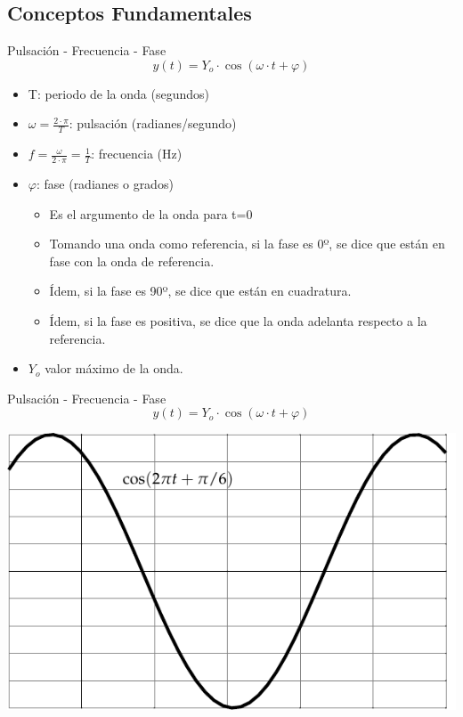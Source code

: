 \documentclass[xcolor={usenames,svgnames,dvipsnames}]{beamer}
\begin{document}
\subsection{Conceptos Fundamentales}
\label{sec:orgd3ab48b}
\begin{frame}[label={sec:org1051934}]{Pulsación - Frecuencia - Fase}
$$y(t)=Y_{o}\cdot\cos(\omega\cdot t+\varphi)$$

\begin{itemize}
\item T: periodo de la onda (segundos)

\item \(\omega=\frac{2\cdot\pi}{T}\): pulsación (radianes/segundo)

\item \(f=\frac{\omega}{2\cdot\pi}=\frac{1}{T}\): frecuencia (Hz)

\item \(\varphi\): fase (radianes o grados)

\begin{itemize}
\item Es el argumento de la onda para t=0

\item Tomando una onda como referencia, si la fase es 0º, se dice que
están en fase con la onda de referencia.

\item Ídem, si la fase es 90º, se dice que están en cuadratura.

\item Ídem, si la fase es positiva, se dice que la onda adelanta
respecto a la referencia.
\end{itemize}

\item \(Y_{o}\) valor máximo de la onda.
\end{itemize}
\end{frame}

\begin{frame}[label={sec:orge0ae1bf}]{Pulsación - Frecuencia - Fase}
$$y(t)=Y_{o}\cdot\cos(\omega\cdot t+\varphi)$$

\begin{center}
\includegraphics[width=.9\linewidth]{../figs/Sin.pdf}
\end{center}
\end{frame}
\end{document}
